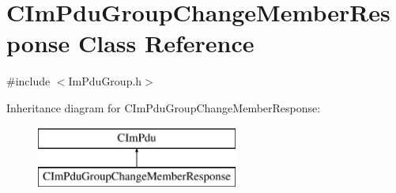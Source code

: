 \hypertarget{class_c_im_pdu_group_change_member_response}{}\section{C\+Im\+Pdu\+Group\+Change\+Member\+Response Class Reference}
\label{class_c_im_pdu_group_change_member_response}


{\ttfamily \#include $<$Im\+Pdu\+Group.\+h$>$}

Inheritance diagram for C\+Im\+Pdu\+Group\+Change\+Member\+Response\+:\begin{figure}[H]
\begin{center}
\leavevmode
\includegraphics[height=2.000000cm]{class_c_im_pdu_group_change_member_response}
\end{center}
\end{figure}
